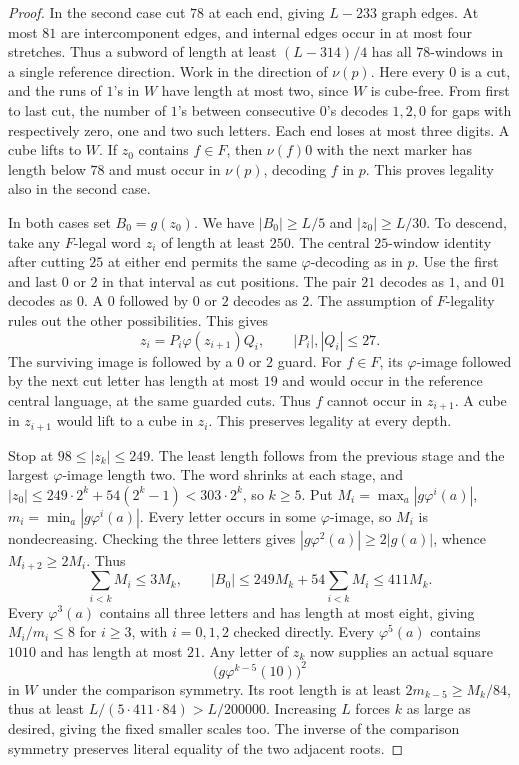 \begin{proof}
In the second case cut \(78\) at each end, giving \(L-233\) graph edges. At most \(81\) are intercomponent edges, and internal edges occur in at most four stretches. Thus a subword of length at least \((L-314)/4\) has all \(78\)-windows in a single reference direction. Work in the direction of \(\nu(p)\). Here every \(0\) is a cut, and the runs of \(1\)'s in \(W\) have length at most two, since \(W\) is cube-free. From first to last cut, the number of \(1\)'s between consecutive \(0\)'s decodes \(1,2,0\) for gaps with respectively zero, one and two such letters. Each end loses at most three digits. A cube lifts to \(W\). If \(z_0\) contains \(f\in F\), then \(\nu(f)0\) with the next marker has length below \(78\) and must occur in \(\nu(p)\), decoding \(f\) in \(p\). This proves legality also in the second case.

In both cases set \(B_0=g(z_0)\). We have \(|B_0|\ge L/5\) and \(|z_0|\ge L/30\). To descend, take any \(F\)-legal word \(z_i\) of length at least \(250\). The central \(25\)-window identity after cutting \(25\) at either end permits the same \(\varphi\)-decoding as in \(p\). Use the first and last \(0\) or \(2\) in that interval as cut positions. The pair \(21\) decodes as \(1\), and \(01\) decodes as \(0\). A \(0\) followed by \(0\) or \(2\) decodes as \(2\). The assumption of \(F\)-legality rules out the other possibilities. This gives
\[
                  z_i=P_i\varphi(z_{i+1})Q_i,\qquad
                  |P_i|,|Q_i|\le27.
\]
The surviving image is followed by a \(0\) or \(2\) guard. For \(f\in F\), its \(\varphi\)-image followed by the next cut letter has length at most \(19\) and would occur in the reference central language, at the same guarded cuts. Thus \(f\) cannot occur in \(z_{i+1}\). A cube in \(z_{i+1}\) would lift to a cube in \(z_i\). This preserves legality at every depth.

Stop at \(98\le|z_k|\le249\). The least length follows from the previous stage and the largest \(\varphi\)-image length two. The word shrinks at each stage, and \(|z_0|\le249\cdot2^k+54(2^k-1)<303\cdot2^k\), so \(k\ge5\). Put \(M_i=\max_a|g\varphi^i(a)|\), \(m_i=\min_a|g\varphi^i(a)|\). Every letter occurs in some \(\varphi\)-image, so \(M_i\) is nondecreasing. Checking the three letters gives \(|g\varphi^2(a)|\ge2|g(a)|\), whence \(M_{i+2}\ge2M_i\). Thus
\[
 \sum_{i<k}M_i\le3M_k,\qquad
 |B_0|\le249 M_k+54\sum_{i<k}M_i\le411 M_k .
\]
Every \(\varphi^3(a)\) contains all three letters and has length at most eight, giving \(M_i/m_i\le8\) for \(i\ge3\), with \(i=0,1,2\) checked directly. Every \(\varphi^5(a)\) contains \(1010\) and has length at most \(21\). Any letter of \(z_k\) now supplies an actual square
\[
                       \big(g\varphi^{k-5}(10)\big)^2
\]
in \(W\) under the comparison symmetry. Its root length is at least \(2m_{k-5}\ge M_k/84\), thus at least \(L/(5\cdot411\cdot84)>L/200000\). Increasing \(L\) forces \(k\) as large as desired, giving the fixed smaller scales too. The inverse of the comparison symmetry preserves literal equality of the two adjacent roots.
\end{proof}

